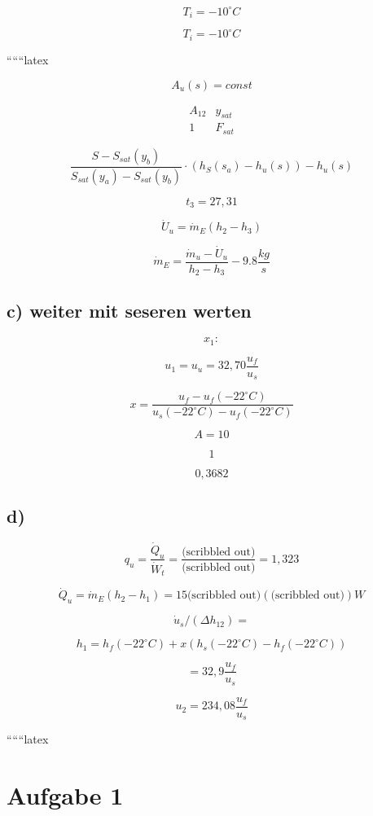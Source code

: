 \[
T_i = -10^\circ C
\]

\[
T_i = -10^\circ C
\]

``````latex


\[
A_{u}(s) = const
\]

\[
\begin{array}{ccc}
A_{12} & y_{sat} \\
1 & F_{sat}
\end{array}
\]

\[
\frac{S - S_{sat}(y_{b})}{S_{sat}(y_{a}) - S_{sat}(y_{b})} \cdot \left( h_{S}(s_{a}) - h_{u}(s) \right) - h_{u}(s)
\]

\[
t_{3} = 27,31
\]

\[
\dot{U}_{u} = \dot{m}_{E} (h_{2} - h_{3})
\]

\[
\dot{m}_{E} = \frac{\dot{m}_{u} - \dot{U}_{u}}{h_{2} - h_{3}} - 9.8 \frac{kg}{s}
\]

\subsection*{c) weiter mit seseren werten}

\[
x_{1}:
\]

\[
u_{1} = u_{u} = 32,70 \frac{u_{f}}{u_{s}}
\]

\[
x = \frac{u_{f} - u_{f}(-22^{\circ}C)}{u_{s}(-22^{\circ}C) - u_{f}(-22^{\circ}C)}
\]

\[
A = 10
\]

\[
1
\]

\[
0,3682
\]

\subsection*{d)}

\[
q_{u} = \frac{\dot{Q}_{u}}{\dot{W}_{t}} = \frac{\text{(scribbled out)}}{\text{(scribbled out)}} = 1,323
\]

\[
\dot{Q}_{u} = \dot{m}_{E} (h_{2} - h_{1}) = 15 \text{(scribbled out)} \left( \text{(scribbled out)} \right) W
\]

\[
\dot{u}_{s} / \left( \Delta h_{12} \right) =
\]

\[
h_{1} = h_{f}(-22^{\circ}C) + x \left( h_{s}(-22^{\circ}C) - h_{f}(-22^{\circ}C) \right)
\]

\[
= 32,9 \frac{u_{f}}{u_{s}}
\]

\[
u_{2} = 234,08 \frac{u_{f}}{u_{s}}
\]

``````latex


\section*{Aufgabe 1}

